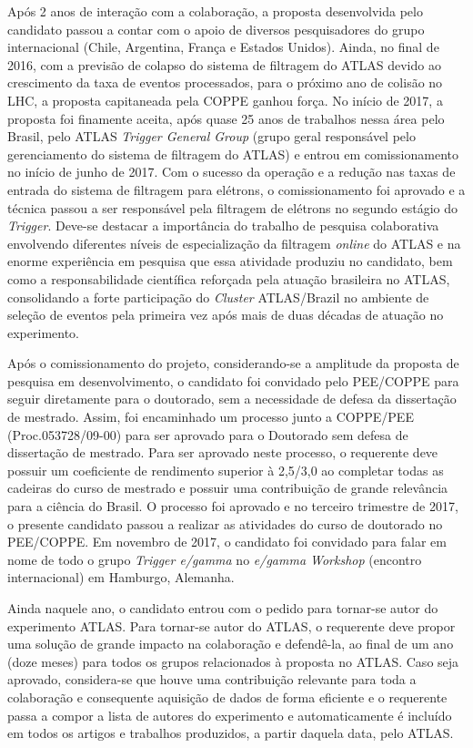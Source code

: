 Após 2 anos de interação com a colaboração, a proposta desenvolvida pelo candidato passou 
a contar com o apoio de diversos pesquisadores do grupo internacional (Chile, Argentina, França e Estados Unidos). 
Ainda, no final de 
2016, com a previsão de colapso do sistema de filtragem do ATLAS devido ao crescimento da 
taxa de eventos processados, para o próximo ano de colisão no LHC, a proposta capitaneada 
pela COPPE ganhou força. No início de 2017, a proposta foi finamente aceita, após quase 
25 anos de trabalhos nessa área pelo Brasil, pelo ATLAS \emph{Trigger General Group} (grupo geral responsável 
pelo gerenciamento do sistema de filtragem do ATLAS) e entrou em comissionamento no início de 
junho de 2017. Com o sucesso da operação e a redução nas taxas de entrada do sistema de 
filtragem para elétrons, o comissionamento foi aprovado e a técnica passou a ser responsável 
pela filtragem de elétrons no segundo estágio do \emph{Trigger}. Deve-se destacar a importância do 
trabalho de pesquisa colaborativa envolvendo diferentes níveis de especialização da filtragem 
\emph{online} do ATLAS e na enorme experiência em pesquisa que essa atividade produziu no 
candidato, bem como a responsabilidade científica reforçada pela atuação brasileira no 
ATLAS, consolidando a forte participação do \emph{Cluster} ATLAS/Brazil no ambiente de seleção 
de eventos pela primeira vez após mais de duas décadas de atuação no experimento.



Após o comissionamento do projeto, considerando-se a amplitude da proposta de pesquisa em 
desenvolvimento, o candidato foi convidado pelo PEE/COPPE para seguir diretamente para o 
doutorado, sem a necessidade de defesa da dissertação de mestrado. Assim, foi encaminhado 
um processo junto a COPPE/PEE (Proc.053728/09-00) para ser aprovado para o Doutorado sem 
defesa de dissertação de mestrado. Para ser aprovado neste processo, o requerente deve 
possuir um coeficiente de rendimento superior à 2,5/3,0 ao completar todas as cadeiras do 
curso de mestrado e possuir uma contribuição de grande relevância para a ciência do Brasil. 
O processo foi aprovado e no terceiro trimestre de 2017, o presente candidato passou a realizar 
as atividades do curso de doutorado no PEE/COPPE. Em novembro de 2017, o candidato foi convidado 
para falar em nome de todo o grupo \emph{Trigger e/gamma} no \emph{e/gamma Workshop} 
(encontro internacional) em Hamburgo, Alemanha.



Ainda naquele ano, o candidato entrou com o pedido para tornar-se autor do experimento ATLAS. 
Para tornar-se autor do ATLAS, o requerente deve propor uma solução de grande impacto na 
colaboração e defendê-la, ao final de um ano (doze meses) para todos os grupos relacionados 
à proposta no ATLAS.  Caso seja aprovado, considera-se que houve uma contribuição relevante 
para toda a colaboração e consequente aquisição de dados de forma eficiente e o requerente 
passa a compor a lista de autores do experimento e automaticamente é incluído em todos os 
artigos e trabalhos produzidos, a partir daquela data, pelo ATLAS. 



